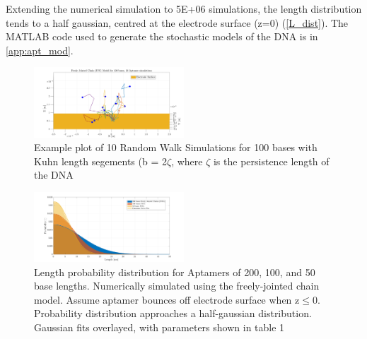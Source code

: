 Extending the numerical simulation to 5E+06 simulations, the length distribution tends to a half gaussian, centred at the electrode surface (z=0) (\autoref{L_dist}). The MATLAB code used to generate the stochastic models of the DNA is in \autoref{app:apt_mod}.
\begin{figure}[H]
    \centering
    \includegraphics[width = 0.5\textwidth]{img/DNA_100_base_simulation_v1.png}
    \caption{Example plot of 10 Random Walk Simulations for 100 bases with Kuhn length segements (b = 2$\zeta$, where $\zeta$ is the persistence length of the DNA}
    \label{Apt_sim}
\end{figure}
\begin{figure}[H]
    \centering
    \includegraphics[width = 0.5\textwidth]{img/length_with_gaussians.png}
    \caption{Length probability distribution for Aptamers of 200, 100, and 50 base lengths. Numerically simulated using the freely-jointed chain model. Assume aptamer bounces off electrode surface when z$\leq$0. Probability distribution approaches a half-gaussian distribution. Gaussian fits overlayed, with parameters shown in table 1}
    \label{L_dist}
\end{figure}

